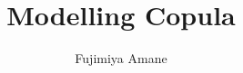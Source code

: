 \newcommand{\HRule}[1]{\rule{\linewidth}{#1}} 	%
\author{Fujimiya Amane}
\title{Modelling Copula}
\renewcommand{\cftchapterfont}{\sffamily\mdseries\large}     %
\renewcommand{\cftchapterpagefont}{\sffamily\mdseries\large} %
%
%
%
{}
\setsecheadstyle{\sffamily\Large}
\setsubsecheadstyle{\sffamily\large}
\setsubsubsecheadstyle{\bfseries\sffamily\normalsize}
\setparaheadstyle{\sffamily\normalsize\itshape}
\titlespacing{\section}{0pt}{5pt}{3pt}
\titlespacing{\subsection}{0pt}{4pt}{3pt}
\titlespacing{\subsubsection}{0pt}{2pt}{2pt}
\renewcommand{\printloftitle}[1]{%
  
  \sffamily\mdseries\Huge #1
}
